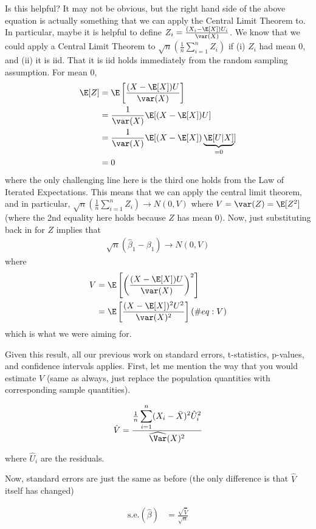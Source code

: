 \documentclass[
  letterpaper,
  DIV=11,
  numbers=noendperiod]{scrreprt}
\begin{document}
Is this helpful? It may not be obvious, but the right hand side of the
above equation is actually something that we can apply the Central Limit
Theorem to. In particular, maybe it is helpful to define
\(Z_i = \frac{(X_i - \E[X]) U_i}{\var(X)}\). We know that we could apply
a Central Limit Theorem to
\(\sqrt{n}\left( \frac{1}{n} \sum_{i=1}^n Z_i \right)\) if (i) \(Z_i\)
had mean 0, and (ii) it is iid. That it is iid holds immediately from
the random sampling assumption. For mean 0, \begin{align*}
  \E[Z] &= \E\left[ \frac{(X - \E[X]) U}{\var(X)}\right] \\
  &= \frac{1}{\var(X)} \E[(X - \E[X]) U] \\
  &= \frac{1}{\var(X)} \E[(X - \E[X]) \underbrace{\E[U|X]}_{=0}] \\
  &= 0
\end{align*} where the only challenging line here is the third one holds
from the Law of Iterated Expectations. This means that we can apply the
central limit theorem, and in particular,
\(\sqrt{n} \left( \frac{1}{n} \sum_{i=1}^n Z_i \right) \rightarrow N(0,V)\)
where \(V=\var(Z) = \E[Z^2]\) (where the 2nd equality here holds because
\(Z\) has mean 0). Now, just substituting back in for \(Z\) implies that
\begin{align*}
  \sqrt{n}(\hat{\beta}_1 - \beta_1) \rightarrow N(0,V)
\end{align*} where \begin{align}
  V &= \E\left[ \left( \frac{(X - \E[X]) U}{\var(X)} \right)^2 \right] \nonumber \\
  &= \E\left[ \frac{(X - \E[X])^2 U^2}{\var(X)^2}\right] (\#eq:V)
\end{align} which is what we were aiming for.

Given this result, all our previous work on standard errors,
t-statistics, p-values, and confidence intervals applies. First, let me
mention the way that you would estimate \(V\) (same as always, just
replace the population quantities with corresponding sample quantities).

\[
  \hat{V} = \frac{ \frac{1}{n} \displaystyle \sum_{i=1}^n (X_i - \bar{X})^2 \hat{U}_i^2}{\widehat{\Var}(X)^2}
\]

where \(\hat{U}_i\) are the residuals.

Now, standard errors are just the same as before (the only difference is
that \(\hat{V}\) itself has changed)

\[
\begin{aligned}
  \textrm{s.e.}(\hat{\beta}) &= \frac{\sqrt{\hat{V}}}{\sqrt{n}}
\end{aligned}
\]
\end{document}
